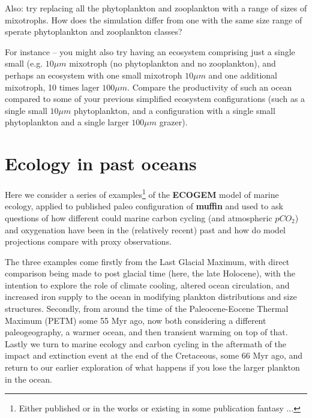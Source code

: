 \documentclass[11pt,fleqn]{book} %
\begin{document}
Also: try replacing all the phytoplankton and zooplankton with a range of sizes of mixotrophs. How does the simulation differ from one with the same size range of sperate phytoplankton and zooplankton classes?

For instance -- you might also try having an ecosystem comprising just a single small (e.g. \(10 \mu m\) mixotroph (no phytoplankton and no zooplankton), and perhaps an ecosystem with one small mixotroph \(10 \mu m\) and one additional mixotroph, 10 times lager \(100 \mu m\). Compare the productivity of such an ocean compared to some of your previous simplified ecosystem configurations (such as a single small \(10 \mu m\) phytoplankton, and a configuration with a single small phytoplankton and a single larger \(100 \mu m\) grazer).
%

\newpage


\section{Ecology in past oceans}

Here we consider a series of examples\footnote{Either published or in the works or existing in some publication fantasy ...} of the \textbf{ECOGEM} model of marine ecology, applied to published paleo configuration of \textbf{muffin} and used to ask questions of how different could marine carbon cycling (and atmospheric \(pCO_{2}\)) and oxygenation have been in the (relatively recent) past and how do model projections compare with proxy observations.

The three examples come firstly from the Last Glacial Maximum, with direct comparison being made to post glacial time (here, the late Holocene), with the intention to explore the role of climate cooling, altered ocean circulation, and increased iron supply to the ocean in modifying plankton distributions and size structures. Secondly, from around the time of the Paleocene-Eocene Thermal Maximum (PETM) some 55 Myr ago, now both considering a different paleogeography, a warmer ocean, and then transient warming on top of that. Lastly we turn to marine ecology and carbon cycling in the aftermath of the impact and extinction event at the end of the Cretaceous, some 66 Myr ago, and return to our earlier exploration of what happens if you lose the larger plankton in the ocean.

\newpage
\end{document}
